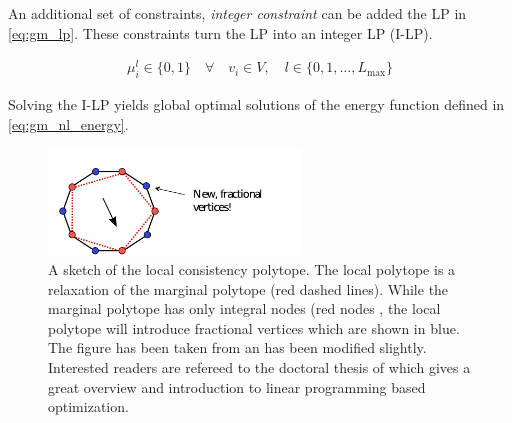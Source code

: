 An additional set of constraints, \emph{integer constraint} can be added the LP in \cref{eq:gm_lp}. These constraints turn the LP into an integer LP (I-LP).

\begin{align}
    \mu_i^l \in \{0,1\} \quad \forall \quad v_{i} \in V,
    \quad l \in \{ 0,1,\ldots,L_{\text{max}} \} \label{eq:integral_constraint}
\end{align}

Solving the I-LP yields
global optimal solutions of the energy function defined in 
\cref{eq:gm_nl_energy}.







\begin{figure}[H]
\centering
\includegraphics[width=0.6\textwidth]{fig/frac_vert2.pdf}
\caption{
    A sketch of the local consistency polytope.
    The local polytope is a relaxation
    of the marginal polytope (red dashed lines).
    While the marginal polytope has only integral
    nodes (red nodes , the local polytope 
    will introduce fractional vertices which are shown
    in blue.
    The figure has been taken from \citep{sontag_2010_thesis}
    an has been modified slightly.
    Interested readers are refereed to the doctoral
    thesis of  \citet{sontag_2010_thesis} which gives
    a great overview and introduction to linear programming
    based optimization.
}\label{fig:local_poly}
\end{figure}





